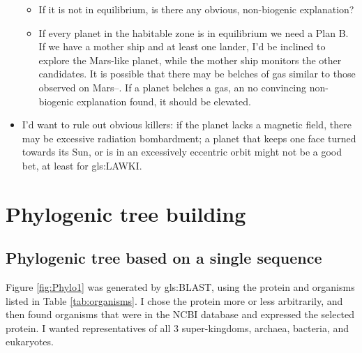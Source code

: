 \documentclass[]{article}
\begin{document}
\begin{itemize}
\begin{itemize}
		\item If it is not in equilibrium, is there any obvious, non-biogenic explanation?
		\item If every planet in the habitable zone is in equilibrium we need a Plan B. If we have a mother ship and at least one lander, I'd be inclined to explore the Mars-like planet, while the mother ship monitors the other candidates. It is possible that there may be belches of gas similar to those observed on Mars--\cite{nasa2019curiosity}. If a planet belches a gas, an no convincing non-biogenic explanation found, it should be elevated. 
	\end{itemize}
	\item I'd want to rule out obvious killers: if the planet lacks a magnetic field, there may be excessive radiation bombardment; a planet that keeps one face turned towards its Sun, or is in an excessively eccentric orbit might not be a good bet, at least for \gls{gls:LAWKI}.  
\end{itemize}

\section{Phylogenic tree building}

\subsection{Phylogenic tree based on a single sequence}

Figure \ref{fig:Phylo1} was generated by \gls{gls:BLAST}, using the protein and organisms listed in Table \ref{tab:organisms}. I chose the protein more or less arbitrarily, and then found organisms that were in the NCBI database and expressed the selected protein. I wanted representatives of all 3 super-kingdoms, archaea, bacteria, and eukaryotes.
\end{document}
